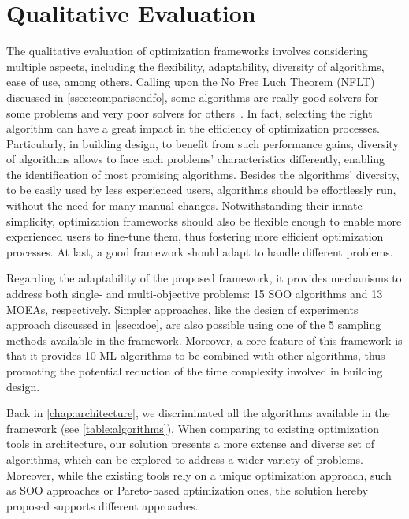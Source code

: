 \section{Qualitative Evaluation}
\label{sec:qualitative}

The qualitative evaluation of optimization frameworks involves considering multiple aspects, including the flexibility, adaptability, diversity of algorithms, ease of use, among others. Calling upon the No Free Luch Theorem (\ac{NFLT}) discussed in \cref{ssec:comparisondfo}, some algorithms are really good solvers for some problems and very poor solvers for others~\cite{Wolpert1997NFLT}. In fact, selecting the right algorithm can have a great impact in the efficiency of optimization processes. Particularly, in building design, to benefit from such performance gains, diversity of algorithms allows to face each problems' characteristics differently, enabling the identification of most promising algorithms. Besides the algorithms' diversity, to be easily used by less experienced users, algorithms should be effortlessly run, without the need for many manual changes. Notwithstanding their innate simplicity, optimization frameworks should also be flexible enough to enable more experienced users to fine-tune them, thus fostering more efficient optimization processes. At last, a good framework should adapt to handle different problems.

Regarding the adaptability of the proposed framework, it provides mechanisms to address both single- and multi-objective problems: 15 \ac{SOO} algorithms and 13 \acp{MOEA}, respectively. Simpler approaches, like the design of experiments approach discussed in \cref{ssec:doe}, are also possible using one of the 5 sampling methods available in the framework. Moreover, a core feature of this framework is that it provides 10 \ac{ML} algorithms to be combined with other algorithms, thus  promoting the potential reduction of the time complexity involved in building design. 

Back in \cref{chap:architecture}, we discriminated all the algorithms available in the framework (see \cref{table:algorithms}). When comparing to existing optimization tools in architecture, our solution presents a more extense and diverse set of algorithms, which can be explored to address a wider variety of problems. Moreover, while the existing tools rely on a unique optimization approach, such as \ac{SOO} approaches or Pareto-based optimization ones, the solution hereby proposed supports different approaches.

